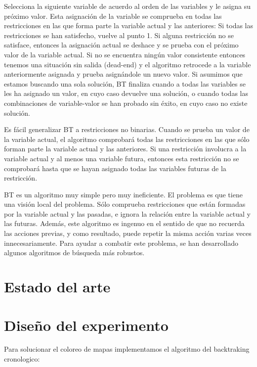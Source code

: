 \documentclass[a4paper]{article}
\begin{document}
Selecciona la siguiente variable de acuerdo al orden de las variables y le asigna su próximo valor. 
Esta asignación de la variable se comprueba en todas las restricciones en las que forma parte la variable actual y las anteriores:
Si todas las restricciones se han satisfecho, vuelve al punto 1.
Si alguna restricción no se satisface, entonces la asignación actual se deshace y se prueba con el próximo valor de la variable actual. 
Si no se encuentra ningún valor consistente entonces tenemos una situación sin salida (dead-end) y el algoritmo retrocede a la variable anteriormente asignada y prueba asignándole un nuevo valor.
Si asumimos que estamos buscando una sola solución, BT finaliza cuando a todas las variables se les ha asignado un valor, en cuyo caso devuelve una solución, o cuando todas las combinaciones de variable-valor se han probado sin éxito, en cuyo caso no existe solución.

Es fácil generalizar BT a restricciones no binarias. Cuando se prueba un valor de la variable actual, el algoritmo comprobará todas las restricciones en las que sólo forman parte la variable actual y las anteriores. Si una restricción involucra a la variable actual y al menos una variable futura, entonces esta restricción no se comprobará hasta que se hayan asignado todas las variables futuras de la restricción.

BT es un algoritmo muy simple pero muy ineficiente. El problema es que tiene una visión local del problema. Sólo comprueba restricciones que están formadas por la variable actual y las pasadas, e ignora la relación entre la variable actual y las futuras. Además, este algoritmo es ingenuo en el sentido de que no recuerda las acciones previas, y como resultado, puede repetir la misma acción varias veces innecesariamente. Para ayudar a combatir este problema, se han desarrollado algunos algoritmos de búsqueda más robustos.

 

\section{Estado del arte}


\pagebreak
\section{Diseño del experimento}

Para solucionar el coloreo de mapas implementamos el algoritmo del backtraking cronologico:
\end{document}
